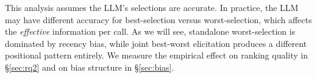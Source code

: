 This analysis assumes the LLM's selections are accurate. In practice, the LLM may have different accuracy for best-selection versus worst-selection, which affects the \emph{effective} information per call. As we will see, standalone worst-selection is dominated by recency bias, while joint best-worst elicitation produces a different positional pattern entirely. We measure the empirical effect on ranking quality in \S\ref{sec:rq2} and on bias structure in \S\ref{sec:bias}.
